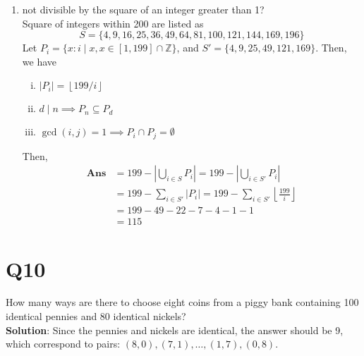 \documentclass[11pt]{article}
\newenvironment{qparts}{\begin{enumerate}[{(}a{)}]}{\end{enumerate}}
\newenvironment{solution}{{\\\bf Solution}:}{\smallskip}
\begin{document}
\begin{qparts}
    Therefore, $\textbf{Ans}=\left\vert A \cup B  \right\vert =
    \left\vert A \right\vert +\left\vert B \right\vert -\left\vert A \cap B  \right\vert =46+20=66$.


    \item not divisible by the square of an integer greater than 1?\\
    Square of integers within 200 are listed as $$S=\{ 4,9,16, 25, 36 ,49 ,
    64 , 81, 100, 121 , 144 , 169 , 196 \}$$
    Let $P_{i }=\{ x\colon i \mid x, x \in [1,199]\cap \mathbb{Z} \}$,
    and $S'=\{ 4,9,25,49 ,121 ,169 \}$. 
    Then, we have 
    \begin{enumerate}[i. ]
        
        \item $\left\vert P_{i } \right\vert =\left\lfloor 199 / i \right\rfloor$
        \item $d \mid n \implies P_{n} \subseteq P_{d}$
        \item $\operatorname{gcd}(i,j)=1\implies P_{i }\cap P_{j }=\emptyset$
    \end{enumerate}
    Then,
    \begin{align*}
        \textbf{Ans}&=199-\left\vert \bigcup_{i \in  S}P_{i}  \right\vert 
                =199-\left\vert \bigcup_{i \in  S'} P_{i } \right\vert \\
                &=199-\sum_{i \in S'}\left\vert P_{i } \right\vert 
                =199-\sum_{i \in S'}\left\lfloor \frac{199}{i} \right\rfloor\\
                &=199-49-22-7-4-1-1\\
                &=115
    \end{align*}
\end{qparts}

\section*{Q10}
How many ways are there to choose eight coins from a piggy bank containing 100 identical pennies and 80 identical nickels?
\begin{solution}
    Since the pennies and nickels are identical, the answer should 
    be 9, which correspond to pairs: $(8,0),(7,1), \ldots ,(1,7),(0,8)$.
\end{solution}
\end{document}
